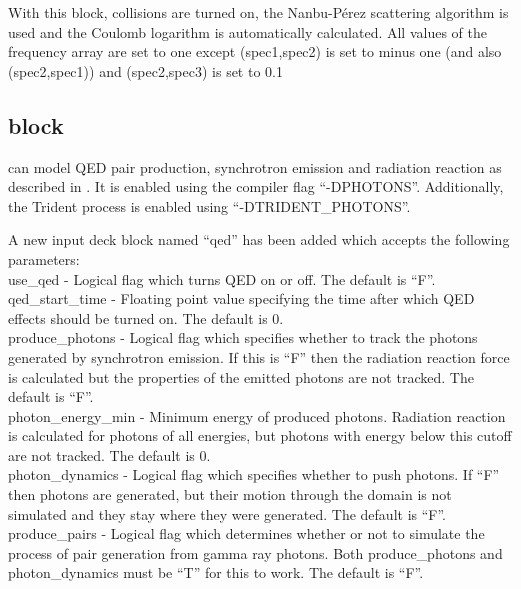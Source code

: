   With this block, collisions are turned on, the Nanbu-P\'erez scattering
  algorithm is used and the Coulomb logarithm is
  automatically calculated. All values of the frequency array are set
  to one except (spec1,spec2) is set to minus one (and also (spec2,spec1))
  and (spec2,spec3) is set to 0.1


\subsection{\texorpdfstring
  { block}
  {           {qed} block}}
\label{sec:qed_block}

{\EPOCH} can model QED pair production, synchrotron emission and
radiation reaction as described in \citet{Duclous}.
It is enabled using the compiler flag ``-DPHOTONS''. Additionally,
the Trident process is enabled using ``-DTRIDENT\_PHOTONS''.

A new input deck block named ``qed'' has been added which accepts the
following parameters:\\

{\emphtext use\_qed} - Logical flag which turns QED on or off. The default
  is ``F''.\\

{\emphtext qed\_start\_time} - Floating point value specifying the time after
  which QED effects should be turned on. The default is 0.\\

{\emphtext produce\_photons} - Logical flag which specifies whether to track
  the photons generated by synchrotron emission. If this is ``F'' then the
  radiation reaction force is calculated but the properties of the emitted
  photons are not tracked. The default is ``F''.\\

{\emphtext photon\_energy\_min} - Minimum energy of produced photons.
  Radiation reaction is calculated for photons of all energies, but photons
  with energy below this cutoff are not tracked.  The default is 0.\\

{\emphtext photon\_dynamics} - Logical flag which specifies whether to push
  photons.  If ``F'' then photons are generated, but their motion through the
  domain is not simulated and they stay where they were generated. The default
  is ``F''.\\

{\emphtext produce\_pairs} - Logical flag which determines whether or not to
  simulate the process of pair generation from gamma ray photons.  Both
  produce\_photons and photon\_dynamics must be ``T'' for this to work. The
  default is ``F''.\\

